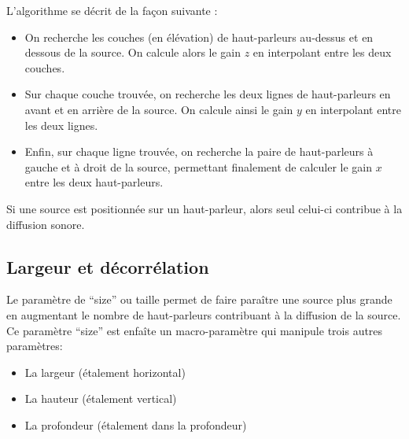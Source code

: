 \documentclass[
  letterpaper,
  DIV=11,
  numbers=noendperiod]{scrreprt}
\providecommand{\tightlist}{%
  \setlength{\itemsep}{0pt}\setlength{\parskip}{0pt}}\usepackage{longtable,booktabs,array}
\begin{document}
L'algorithme se décrit de la façon suivante :

\begin{itemize}
\tightlist
\item
  On recherche les couches (en élévation) de haut-parleurs au-dessus et
  en dessous de la source. On calcule alors le gain \(z\) en interpolant
  entre les deux couches.
\item
  Sur chaque couche trouvée, on recherche les deux lignes de
  haut-parleurs en avant et en arrière de la source. On calcule ainsi le
  gain \(y\) en interpolant entre les deux lignes.
\item
  Enfin, sur chaque ligne trouvée, on recherche la paire de
  haut-parleurs à gauche et à droit de la source, permettant finalement
  de calculer le gain \(x\) entre les deux haut-parleurs.
\end{itemize}

\begin{tcolorbox}[enhanced jigsaw, leftrule=.75mm, arc=.35mm, bottomtitle=1mm, colback=white, colbacktitle=quarto-callout-note-color!10!white, opacityback=0, left=2mm, rightrule=.15mm, opacitybacktitle=0.6, breakable, toptitle=1mm, titlerule=0mm, bottomrule=.15mm, toprule=.15mm, coltitle=black, title=\textcolor{quarto-callout-note-color}{\faInfo}\hspace{0.5em}{Note}]

Si une source est positionnée sur un haut-parleur, alors seul celui-ci
contribue à la diffusion sonore.

\end{tcolorbox}

\hypertarget{largeur-et-duxe9corruxe9lation}{%
\subsection{Largeur et
décorrélation}\label{largeur-et-duxe9corruxe9lation}}

Le paramètre de ``size'' ou taille permet de faire paraître une source
plus grande en augmentant le nombre de haut-parleurs contribuant à la
diffusion de la source. Ce paramètre ``size'' est enfaîte un
macro-paramètre qui manipule trois autres paramètres:

\begin{itemize}
\tightlist
\item
  La largeur (étalement horizontal)
\item
  La hauteur (étalement vertical)
\item
  La profondeur (étalement dans la profondeur)
\end{itemize}
\end{document}
